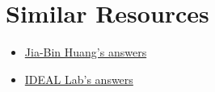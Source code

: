 \documentclass{article}
\begin{document}
\section{Similar Resources}

\begin{itemize}
    \item \href{https://jbhuang0604.github.io/advisor_guide.html}{Jia-Bin Huang's answers}
    \item \href{https://ideal.umd.edu/blog/Prospective-Students-FAQ}{IDEAL Lab's answers}
\end{itemize}























\end{document}
